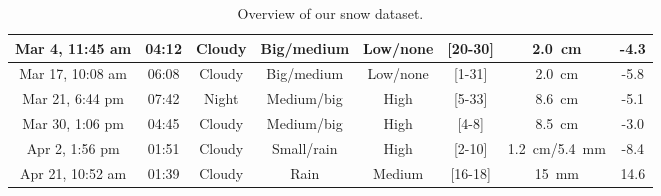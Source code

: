 \begin{table}[htbp]
\begin{tabular}{|c|c|c|c|c|c|c|c|}
        Mar 4, 11:45 am    &  04:12            & Cloudy        & Big/medium          & Low/none         & [20-30]                        & \SI{2.0}{\cm}                & -4.3  \\\hline
        Mar 17, 10:08 am   &  06:08            & Cloudy        & Big/medium          & Low/none         & [1-31]                         & \SI{2.0}{\cm}                & -5.8  \\\hline
        Mar 21, 6:44 pm    &  07:42            & Night         & Medium/big          & High             & [5-33]                         & \SI{8.6}{\cm}                & -5.1  \\\hline
        Mar 30, 1:06 pm    &  04:45            & Cloudy        & Medium/big          & High             & [4-8]                          & \SI{8.5}{\cm}                & -3.0  \\\hline
        Apr 2, 1:56 pm     &  01:51            & Cloudy        & Small/rain          & High             & [2-10]                         & \SI{1.2}{\cm}/\SI{5.4}{\mm}  & -8.4  \\\hline
        Apr 21, 10:52 am   &  01:39            & Cloudy        & Rain                & Medium           & [16-18]                        & \SI{15}{\mm}                 & 14.6  \\\hline
    \end{tabular}
    \caption{Overview of our snow dataset.}
    \label{tab:overview-dataset}
\end{table}

